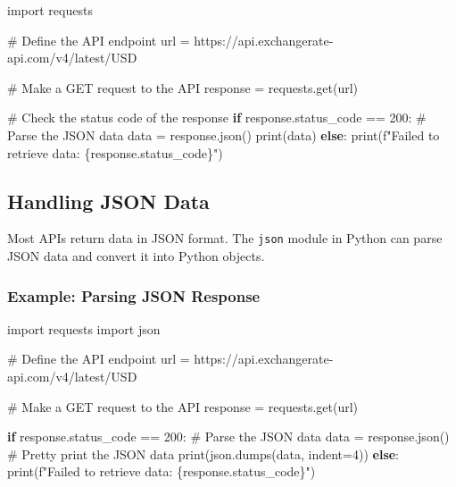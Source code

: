 \documentclass[
  letterpaper,
  DIV=11,
  numbers=noendperiod]{scrreprt}
\newenvironment{Shaded}{\begin{snugshade}}{\end{snugshade}}
\newcommand{\BuiltInTok}[1]{\textcolor[rgb]{0.00,0.23,0.31}{#1}}
\newcommand{\CommentTok}[1]{\textcolor[rgb]{0.37,0.37,0.37}{#1}}
\newcommand{\ControlFlowTok}[1]{\textcolor[rgb]{0.00,0.23,0.31}{\textbf{#1}}}
\newcommand{\DecValTok}[1]{\textcolor[rgb]{0.68,0.00,0.00}{#1}}
\newcommand{\ImportTok}[1]{\textcolor[rgb]{0.00,0.46,0.62}{#1}}
\newcommand{\NormalTok}[1]{\textcolor[rgb]{0.00,0.23,0.31}{#1}}
\newcommand{\OperatorTok}[1]{\textcolor[rgb]{0.37,0.37,0.37}{#1}}
\newcommand{\SpecialCharTok}[1]{\textcolor[rgb]{0.37,0.37,0.37}{#1}}
\newcommand{\SpecialStringTok}[1]{\textcolor[rgb]{0.13,0.47,0.30}{#1}}
\newcommand{\StringTok}[1]{\textcolor[rgb]{0.13,0.47,0.30}{#1}}
\begin{document}
\begin{Shaded}
\begin{Highlighting}[]
\ImportTok{import}\NormalTok{ requests}

\CommentTok{\# Define the API endpoint}
\NormalTok{url }\OperatorTok{=} \StringTok{\textquotesingle{}https://api.exchangerate{-}api.com/v4/latest/USD\textquotesingle{}}

\CommentTok{\# Make a GET request to the API}
\NormalTok{response }\OperatorTok{=}\NormalTok{ requests.get(url)}

\CommentTok{\# Check the status code of the response}
\ControlFlowTok{if}\NormalTok{ response.status\_code }\OperatorTok{==} \DecValTok{200}\NormalTok{:}
    \CommentTok{\# Parse the JSON data}
\NormalTok{    data }\OperatorTok{=}\NormalTok{ response.json()}
    \BuiltInTok{print}\NormalTok{(data)}
\ControlFlowTok{else}\NormalTok{:}
    \BuiltInTok{print}\NormalTok{(}\SpecialStringTok{f"Failed to retrieve data: }\SpecialCharTok{\{}\NormalTok{response}\SpecialCharTok{.}\NormalTok{status\_code}\SpecialCharTok{\}}\SpecialStringTok{"}\NormalTok{)}
\end{Highlighting}
\end{Shaded}

\subsection{Handling JSON Data}\label{handling-json-data-1}

Most APIs return data in JSON format. The \texttt{json} module in Python
can parse JSON data and convert it into Python objects.

\subsubsection{Example: Parsing JSON
Response}\label{example-parsing-json-response}

\begin{Shaded}
\begin{Highlighting}[]
\ImportTok{import}\NormalTok{ requests}
\ImportTok{import}\NormalTok{ json}

\CommentTok{\# Define the API endpoint}
\NormalTok{url }\OperatorTok{=} \StringTok{\textquotesingle{}https://api.exchangerate{-}api.com/v4/latest/USD\textquotesingle{}}

\CommentTok{\# Make a GET request to the API}
\NormalTok{response }\OperatorTok{=}\NormalTok{ requests.get(url)}

\ControlFlowTok{if}\NormalTok{ response.status\_code }\OperatorTok{==} \DecValTok{200}\NormalTok{:}
    \CommentTok{\# Parse the JSON data}
\NormalTok{    data }\OperatorTok{=}\NormalTok{ response.json()}
    \CommentTok{\# Pretty print the JSON data}
    \BuiltInTok{print}\NormalTok{(json.dumps(data, indent}\OperatorTok{=}\DecValTok{4}\NormalTok{))}
\ControlFlowTok{else}\NormalTok{:}
    \BuiltInTok{print}\NormalTok{(}\SpecialStringTok{f"Failed to retrieve data: }\SpecialCharTok{\{}\NormalTok{response}\SpecialCharTok{.}\NormalTok{status\_code}\SpecialCharTok{\}}\SpecialStringTok{"}\NormalTok{)}
\end{Highlighting}
\end{Shaded}
\end{document}
